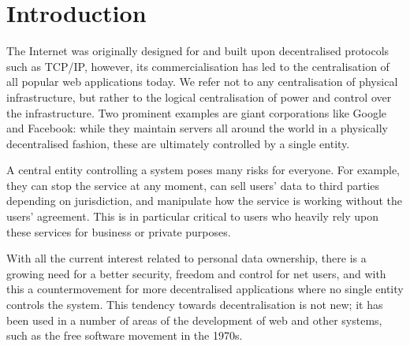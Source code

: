 \section{Introduction}\label{sec:intro}
The Internet was originally designed for and built upon decentralised protocols such as TCP/IP, however, its commercialisation has led to the centralisation of all popular web applications today. We refer not to any centralisation of physical infrastructure, but rather to the logical centralisation of power and control over the infrastructure. Two prominent examples are giant corporations like Google and Facebook: while they maintain servers all around the world in a physically decentralised fashion, these are ultimately controlled by a single entity.

A central entity controlling a system poses many risks for everyone. For example, they can stop the service at any moment, can sell users' data to third parties depending on jurisdiction, and manipulate how the service is working without the users' agreement. This is in particular critical to users who heavily rely upon these services for business or private purposes.

With all the current interest related to personal data ownership, there is a growing need for a better security, freedom and control for net users, and with this a countermovement for more decentralised applications where no single entity controls the system. This tendency towards decentralisation is not new; it has been used in a number of areas of the development of web and other systems, such as the free software movement in the 1970s. %

